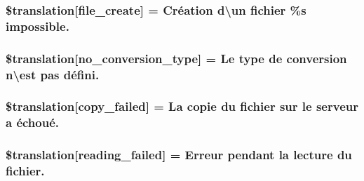 \subsubsection[{\$translation}]{\setlength{\rightskip}{0pt plus 5cm}\$translation\mbox{[}\textquotesingle{}file\+\_\+create\textquotesingle{}\mbox{]} = \textquotesingle{}Création d\textbackslash{}\textquotesingle{}un fichier \%s impossible.\textquotesingle{}}\label{class_8upload_8fr___f_r_8php_a1ecb4673e4fb69e06b3f20b65cecf30a}
\hypertarget{class_8upload_8fr___f_r_8php_a4712d7ec28e9a7f17eb3338af2358363}{}
\subsubsection[{\$translation}]{\setlength{\rightskip}{0pt plus 5cm}\$translation\mbox{[}\textquotesingle{}no\+\_\+conversion\+\_\+type\textquotesingle{}\mbox{]} = \textquotesingle{}Le type de conversion n\textbackslash{}\textquotesingle{}est pas défini.\textquotesingle{}}\label{class_8upload_8fr___f_r_8php_a4712d7ec28e9a7f17eb3338af2358363}
\hypertarget{class_8upload_8fr___f_r_8php_a783c9358bcf54a054545b50098bc679b}{}
\subsubsection[{\$translation}]{\setlength{\rightskip}{0pt plus 5cm}\$translation\mbox{[}\textquotesingle{}copy\+\_\+failed\textquotesingle{}\mbox{]} = \textquotesingle{}La copie du fichier sur le serveur a échoué.\textquotesingle{}}\label{class_8upload_8fr___f_r_8php_a783c9358bcf54a054545b50098bc679b}
\hypertarget{class_8upload_8fr___f_r_8php_a01bea14c9fd5f353f62db44beabfcd42}{}
\subsubsection[{\$translation}]{\setlength{\rightskip}{0pt plus 5cm}\$translation\mbox{[}\textquotesingle{}reading\+\_\+failed\textquotesingle{}\mbox{]} = \textquotesingle{}Erreur pendant la lecture du fichier.\textquotesingle{}}\label{class_8upload_8fr___f_r_8php_a01bea14c9fd5f353f62db44beabfcd42}
